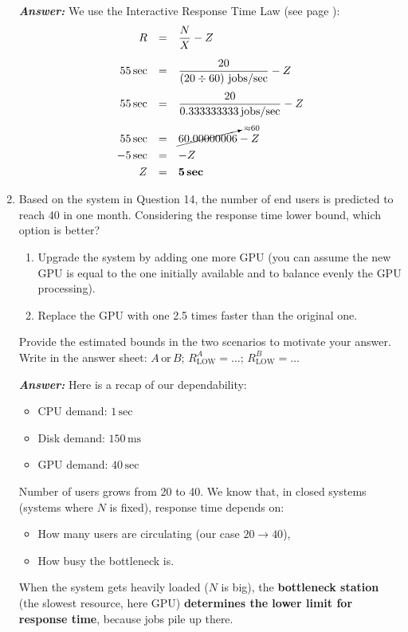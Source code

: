 \begin{enumerate}
    \textcolor{Green3}{\textbf{\emph{Answer:}}} We use the Interactive Response Time Law (see page \pageref{paragraph: Interactive Response Time Law}):
    \begin{equation*}
        \begin{array}{rcl}
            R &=& \dfrac{N}{X} - Z \\ [1.3em]
            55 \, \text{sec} &=& \dfrac{20}{\left(20 \div 60\right) \,\text{jobs/sec}} - Z \\ [1.3em]
            55 \, \text{sec} &=& \dfrac{20}{0.333333333 \,\text{jobs/sec}} - Z \\ [1.3em]
            55 \, \text{sec} &=& \cancelto{\approx 60}{60.00000006} - Z \\ [.3em]
            -5 \, \text{sec} &=& - Z \\ [.3em]
            Z &=& \mathbf{5} \, \textbf{sec}
        \end{array}
    \end{equation*}

    \item Based on the system in Question 14, the number of end users is predicted to reach 40 in one month. Considering the response time lower bound, which option is better?
    \begin{enumerate}
        \item Upgrade the system by adding one more GPU (you can assume the new GPU is equal to the one initially available and to balance evenly the GPU processing).
        \item Replace the GPU with one 2.5 times faster than the original one.
    \end{enumerate}
    Provide the estimated bounds in the two scenarios to motivate your answer. Write in the answer sheet: $A \, \text{or} \, B$; $R_{\text{LOW}}^{A} = \dots$; $R_{\text{LOW}}^{B} = \dots$

    \textcolor{Green3}{\textbf{\emph{Answer:}}} Here is a recap of our dependability:
    \begin{itemize}
        \item CPU demand: $1 \, \text{sec}$
        \item Disk demand: $150 \, \text{ms}$
        \item GPU demand: $40 \, \text{sec}$
    \end{itemize}
    Number of users grows from 20 to 40. We know that, in closed systems (systems where $N$ is fixed), response time depends on:
    \begin{itemize}
        \item How many users are circulating (our case $20 \to 40$),
        \item How busy the bottleneck is.
    \end{itemize}
    When the system gets heavily loaded ($N$ is big), the \textbf{bottleneck station} (the slowest resource, here GPU) \textbf{determines the lower limit for response time}, because jobs pile up there.


\end{enumerate}
